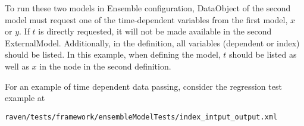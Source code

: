 To run these two models in Ensemble configuration,  DataObject of the second model
must request one of the time-dependent variables from the first model, $x$ or $y$.  If $t$ is directly
requested, it will not be made available in the second ExternalModel.  Additionally, in the 
definition, all variables (dependent or index) should be listed.  In this example, when defining the model,
$t$ should be listed as well as $x$ in the  node in the second  definition.

For an example of time dependent data passing, consider the regression test example at
\begin{verbatim}
raven/tests/framework/ensembleModelTests/index_intput_output.xml
\end{verbatim}
